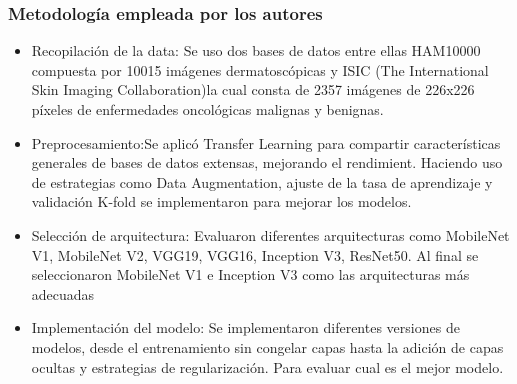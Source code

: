 \subsubsection{Metodología empleada por los autores}
\newcommand{\MEDone}{Recopilación de la data: Se uso dos bases de datos entre ellas HAM10000 compuesta por 10015 imágenes dermatoscópicas y ISIC (The International Skin Imaging Collaboration)la cual consta de 2357 imágenes de 226x226 píxeles de enfermedades oncológicas malignas y benignas.
}
\newcommand{\MEDtwo}{ Preprocesamiento:Se aplicó Transfer Learning para compartir características generales de bases de datos extensas, mejorando el rendimient. Haciendo uso de estrategias como Data Augmentation, ajuste de la tasa de aprendizaje y validación K-fold se implementaron para mejorar los modelos.
}

\newcommand{\MEDthree}{ Selección de arquitectura: Evaluaron diferentes arquitecturas como MobileNet V1, MobileNet V2, VGG19, VGG16, Inception V3, ResNet50. 
Al final se seleccionaron MobileNet V1 e Inception V3 como las arquitecturas más adecuadas
}

\newcommand{\MEDfour}{Implementación del modelo: Se implementaron diferentes versiones de modelos, desde el entrenamiento sin congelar capas hasta la adición de capas ocultas y estrategias de regularización. Para evaluar cual es el mejor modelo.
}


\begin{itemize}
	\item \MEDone
	\item \MEDtwo
	\item \MEDthree
	\item \MEDfour
\end{itemize}

